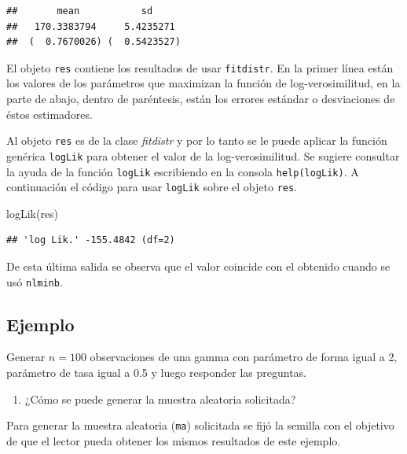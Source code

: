 \documentclass[
]{book}
\makeatletter
\newenvironment{Shaded}{\begin{snugshade}}{\end{snugshade}}
\newcommand{\FunctionTok}[1]{\textcolor[rgb]{0.00,0.00,0.00}{#1}}
\newcommand{\NormalTok}[1]{#1}
\providecommand{\tightlist}{%
  \setlength{\itemsep}{0pt}\setlength{\parskip}{0pt}}
\newenvironment{kframe}{%
\medskip{}
\setlength{\fboxsep}{.8em}
 \def\at@end@of@kframe{}%
 \ifinner\ifhmode%
  \def\at@end@of@kframe{\end{minipage}}%
  \begin{minipage}{\columnwidth}%
 \fi\fi%
 \def\FrameCommand##1{\hskip\@totalleftmargin \hskip-\fboxsep
 \colorbox{shadecolor}{##1}\hskip-\fboxsep
     \hskip-\linewidth \hskip-\@totalleftmargin \hskip\columnwidth}%
 \MakeFramed {\advance\hsize-\width
   \@totalleftmargin\z@ \linewidth\hsize
   \@setminipage}}%
 {\par\unskip\endMakeFramed%
 \at@end@of@kframe}
\renewenvironment{Shaded}{\begin{kframe}}{\end{kframe}}
\makeatother
\begin{document}
\begin{verbatim}
##       mean           sd     
##   170.3383794     5.4235271 
##  (  0.7670026) (  0.5423527)
\end{verbatim}

El objeto \texttt{res} contiene los resultados de usar \texttt{fitdistr}. En la primer línea están los valores de los parámetros que maximizan la función de log-verosimilitud, en la parte de abajo, dentro de paréntesis, están los errores estándar o desviaciones de éstos estimadores.

Al objeto \texttt{res} es de la clase \emph{fitdistr} y por lo tanto se le puede aplicar la función genérica \texttt{logLik} para obtener el valor de la log-verosimilitud. Se sugiere consultar la ayuda de la función \texttt{logLik} escribiendo en la consola \texttt{help(logLik)}. A continuación el código para usar \texttt{logLik} sobre el objeto \texttt{res}.

\begin{Shaded}
\begin{Highlighting}[]
\FunctionTok{logLik}\NormalTok{(res)}
\end{Highlighting}
\end{Shaded}

\begin{verbatim}
## 'log Lik.' -155.4842 (df=2)
\end{verbatim}

De esta última salida se observa que el valor coincide con el obtenido cuando se usó \texttt{nlminb}.

\hypertarget{ejemplo-51}{%
\subsection*{Ejemplo}\label{ejemplo-51}}

Generar \(n=100\) observaciones de una gamma con parámetro de forma igual a 2, parámetro de tasa igual a 0.5 y luego responder las preguntas.

\begin{enumerate}
\def\labelenumi{\arabic{enumi})}
\tightlist
\item
  ¿Cómo se puede generar la muestra aleatoria solicitada?
\end{enumerate}

Para generar la muestra aleatoria (\texttt{ma}) solicitada se fijó la semilla con el objetivo de que el lector pueda obtener los mismos resultados de este ejemplo.
\end{document}
